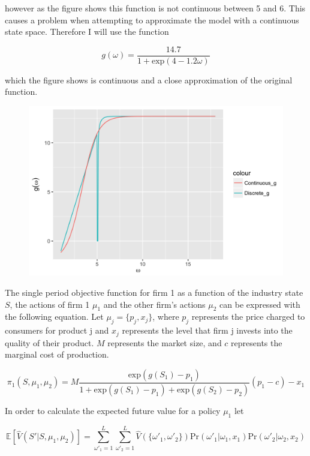 \documentclass[12pt]{article}
\begin{document}
however as the figure shows this function is not continuous between 5 and 6. This causes a problem when attempting to approximate the model with a continuous state space. Therefore I will use the function

\begin{equation*}
  g(\omega) = \frac{14.7}{1+\text{exp}(4-1.2\omega)}
\end{equation*}

which the figure shows is continuous and a close approximation of the original function.

\begin{figure}[H]
  \centering
  \includegraphics{plot_g}
\end{figure}


The single period objective function for firm 1 as a function of the industry state $S$, the actions of firm 1 $\mu_1$ and the other firm's actions $\mu_{2}$ can be expressed with the following equation. Let $\mu_j=\{p_j,x_j\}$, where $p_j$ represents the price charged to consumers for product j and $x_j$ represents the level that firm j invests into the quality of their product. $M$ represents the market size, and $c$ represents the marginal cost of production.

\begin{equation*}
  \pi_1(S,\mu_{1},\mu_{2})=M \frac{\text{exp}(g(S_1)-p_1)}{1+\text{exp}(g(S_1)-p_1)+\text{exp}(g(S_2)-p_2)} (p_1-c)-x_1
\end{equation*}

In order to calculate the expected future value for a policy $\mu_1$ let

\begin{equation*}
  \mathbb{E}[\hat{V}(S'|S,\mu_{1},\mu_{2})] = \sum_{\omega'_1=1}^L \sum_{\omega'_2=1}^L \hat{V}(\{\omega'_1,\omega'_2\}) \text{Pr}(\omega'_1|\omega_1,x_{1}) \text{Pr}(\omega'_2|\omega_2,x_{2})
\end{equation*}
\end{document}
